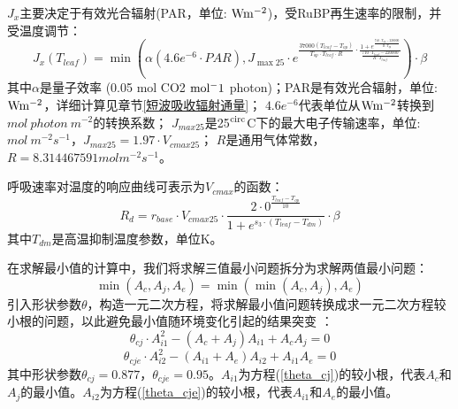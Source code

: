 $J_x$主要决定于有效光合辐射(PAR，单位: $\rm W m^{-2}$)，受RuBP再生速率的限制，并受温度调节：
\begin{equation}
J_{x}\left(T_{{leaf }}\right)=\min \left(\alpha\left(4.6 e^{-6} \cdot P A R\right), J_{\max 25}
 \cdot e^{\frac{37000\left(T_{{leaf }}-T_{o p}\right)}{T_{o p} \cdot T_{{leaf }} \cdot R} \cdot \frac{1+e^{\frac{710 \cdot T_{o p}-220000}
 {R \cdot T_{o p}}}}{\frac{710 \cdot T_{{leaf }}-220000}{R \cdot T_{{leaf }}}}}\right) \cdot \beta
\end{equation}
其中$\alpha$是量子效率 (0.05 mol CO2 $\rm mol^-1$ photon)；PAR是有效光合辐射，单位: $\rm W m^{-2}$，详细计算见章节\ref{短波吸收辐射通量}；
$4.6e^{-6}$代表单位从$\rm W m^{-2}$转换到$mol\ photon\ m^{-2}$的转换系数；
$J_{max25}$是25$\rm ^{circ}$C下的最大电子传输速率，单位: $mol\ m^{-2}s^{-1}$，$J_{max25}=1.97 \cdot V_{cmax25}$； 
$R$是通用气体常数，$R=8.314467591 mol m^{-2}s^{-1}$。


呼吸速率对温度的响应曲线可表示为$V_{cmax}$的函数：
\begin{equation}\label{R_d1}
R_{d}=r_{{base }} \cdot V_{cmax 25} \cdot \frac{2 \cdot 0^{\frac{T_{leaf}-T_{op}}{10}}}{1+e^{s_3 \cdot\left(T_{leaf}-T_{d m}\right)}} \cdot \beta
\end{equation}
其中$T_{dm}$是高温抑制温度参数，单位K。



在求解最小值的计算中，我们将求解三值最小问题拆分为求解两值最小问题：
\begin{equation}\label{min_Ac_Aj_Ae}
\min \left(A_{c}, A_{j}, A_{e}\right)=\min \left(\min \left(A_{c}, A_{j}\right), A_{e}\right)
\end{equation}
引入形状参数$\theta$，构造一元二次方程，将求解最小值问题转换成求一元二次方程较小根的问题，以此避免最小值随环境变化引起的结果突变 \citep{collatz1991,collatz1992}：
\begin{equation}\label{theta_cj}
\theta_{c j} \cdot A_{i1}^{2}-\left(A_{c}+A_{j}\right) A_{i1}+A_{c} A_{j}=0
\end{equation}
\begin{equation}\label{theta_cje}
\theta_{c j e} \cdot A_{i2}^{2}-\left(A_{i1}+A_{e}\right) A_{i2}+A_{i1} A_{e}=0
\end{equation}
其中形状参数$\theta_{cj}=0.877$，$\theta_{cje}=0.95$。$A_{i1}$为方程(\ref{theta_cj})的较小根，代表$A_c$和$A_j$的最小值。$A_{i2}$为方程(\ref{theta_cje})的较小根，代表$A_{i1}$和$A_e$的最小值。



